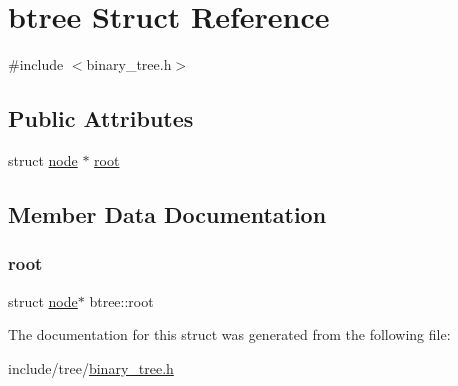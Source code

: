 \hypertarget{structbtree}{}\section{btree Struct Reference}
\label{structbtree}


{\ttfamily \#include $<$binary\+\_\+tree.\+h$>$}

\subsection*{Public Attributes}
\begin{DoxyCompactItemize}
\item 
struct \mbox{\hyperlink{structnode}{node}} $\ast$ \mbox{\hyperlink{structbtree_a901e2e779c2f961750ac0bf8d1b495f9}{root}}
\end{DoxyCompactItemize}


\subsection{Member Data Documentation}
\mbox{\label{structbtree_a901e2e779c2f961750ac0bf8d1b495f9}} 
\subsubsection{\texorpdfstring{root}{root}}
{\footnotesize\ttfamily struct \mbox{\hyperlink{structnode}{node}}$\ast$ btree\+::root}



The documentation for this struct was generated from the following file\+:\begin{DoxyCompactItemize}
\item 
include/tree/\mbox{\hyperlink{binary__tree_8h}{binary\+\_\+tree.\+h}}\end{DoxyCompactItemize}
